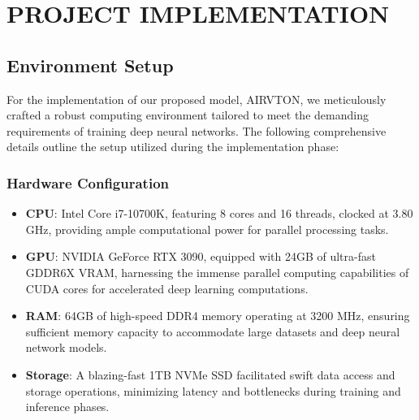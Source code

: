 \chapter[Project Implementation]{PROJECT IMPLEMENTATION}

\section{Environment Setup}

For the implementation of our proposed model, AIRVTON, we meticulously crafted a robust computing environment tailored to meet the demanding requirements of training deep neural networks. The following comprehensive details outline the setup utilized during the implementation phase:

\subsection{Hardware Configuration}
\begin{itemize}
  \item \textbf{CPU}: Intel Core i7-10700K, featuring 8 cores and 16 threads, clocked at 3.80 GHz, providing ample computational power for parallel processing tasks.
  \item \textbf{GPU}: NVIDIA GeForce RTX 3090, equipped with 24GB of ultra-fast GDDR6X VRAM, harnessing the immense parallel computing capabilities of CUDA cores for accelerated deep learning computations.
  \item \textbf{RAM}: 64GB of high-speed DDR4 memory operating at 3200 MHz, ensuring sufficient memory capacity to accommodate large datasets and deep neural network models.
  \item \textbf{Storage}: A blazing-fast 1TB NVMe SSD facilitated swift data access and storage operations, minimizing latency and bottlenecks during training and inference phases.
\end{itemize}

